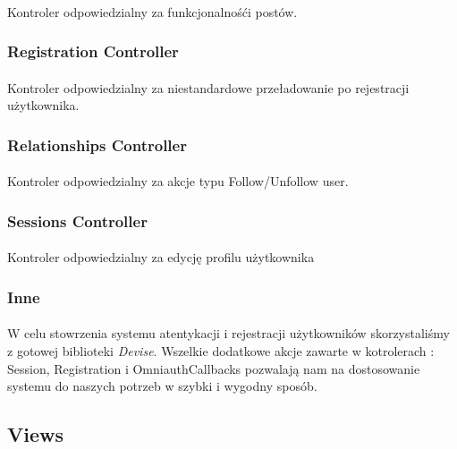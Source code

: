 \documentclass[wide,a4paper,titlepage,12pt] {article}
\begin{document}
    \paragraph{}
    Kontroler odpowiedzialny za funkcjonalnośći postów.
    
    \subsubsection{Registration Controller}
    \paragraph{}
    Kontroler odpowiedzialny za niestandardowe przeładowanie po rejestracji użytkownika.
    
    \subsubsection{Relationships Controller}
    \paragraph{}
    Kontroler odpowiedzialny za akcje typu Follow/Unfollow user.

    \subsubsection{Sessions Controller}
    \paragraph{}
    Kontroler odpowiedzialny za edycję profilu użytkownika

    \subsubsection{Inne}
    \paragraph{}
    W celu stowrzenia systemu atentykacji i rejestracji użytkowników skorzystaliśmy z gotowej biblioteki \textit{Devise}. Wszelkie dodatkowe akcje zawarte w kotrolerach : Session, Registration i OmniauthCallbacks pozwalają nam na dostosowanie systemu do naszych potrzeb w szybki i wygodny sposób.

    \subsection{Views}
\end{document}
